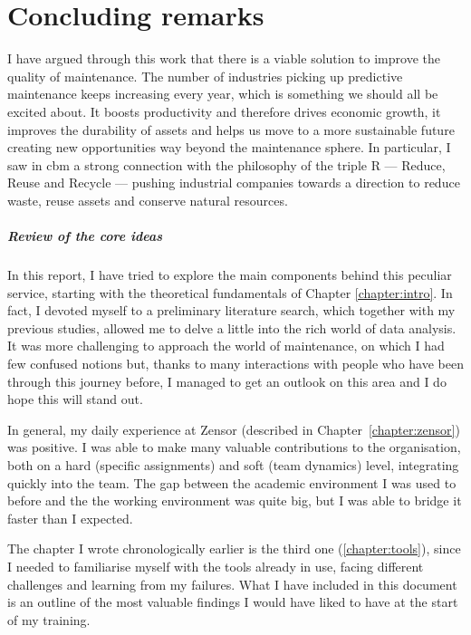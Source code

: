 \chapter{Concluding remarks}
I have argued through this work that there is a viable solution to improve the quality of maintenance. %
The number of industries picking up predictive maintenance keeps increasing every year, which is something we should all be excited about. 
It boosts productivity and therefore drives economic growth, it improves the durability of assets and helps us move to a more sustainable future creating new opportunities way beyond the maintenance sphere.
In particular, I saw in \acl{cbm} a strong connection with the philosophy of the triple R --- Reduce, Reuse and Recycle --- pushing industrial companies towards a direction to reduce waste, reuse assets and conserve natural resources. 

\paragraph{Review of the core ideas}
In this report, I have tried to explore the main components behind this peculiar service, starting with the theoretical fundamentals of Chapter \ref{chapter:intro}. 
In fact, I devoted myself to a preliminary literature search, which together with my previous studies, allowed me to delve a little into the rich world of data analysis. 
It was more challenging to approach the world of maintenance, on which I had few confused notions but, thanks to many interactions with people who have been through this journey before, 
I managed to get an outlook on this area and I do hope this will stand out.

In general, my daily experience at Zensor (described in Chapter~\ref{chapter:zensor}) was positive. I was able to make many valuable contributions to the organisation, both on a hard (specific assignments) and soft (team dynamics) level, integrating quickly into the team. 
The gap between the academic environment I was used to before and the the working environment was quite big, but I was able to bridge it faster than I expected.

The chapter I wrote chronologically earlier is the third one (\ref{chapter:tools}), since I needed to familiarise myself with the tools already in use, facing different challenges and learning from my failures.
What I have included in this document is an outline of the most valuable findings I would have liked to have at the start of my training.

